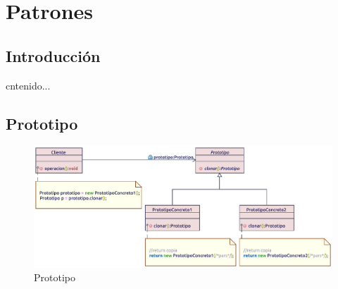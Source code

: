 \chapter{Patrones}
\section{Introducción}
cntenido...
\newpage

\section{Prototipo}

\begin{figure}[h!]
	\centering
	\includegraphics[width=0.7\linewidth]{diseno/patrones/imgs/prototipo}
	\caption{Prototipo}
\end{figure}



